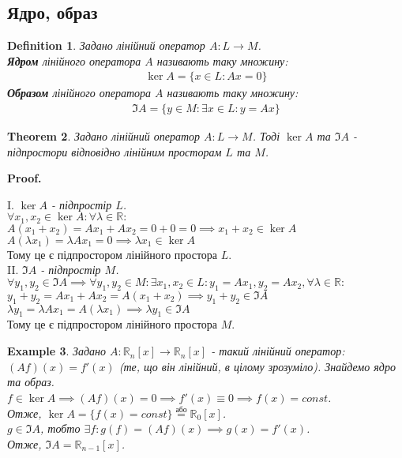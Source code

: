 \documentclass[a4paper, 10pt]{article}
\makeatletter
\theoremstyle{theoremdd}
\newtheorem{theorem}{Theorem}[subsection]
\newtheorem{definition}[theorem]{Definition}
\newtheorem{example}[theorem]{Example}
\renewenvironment{proof}[1][Proof.\\]{\par
\pushQED{\hfill \qed}%
\normalfont \topsep6\p@\@plus6\p@\relax
\trivlist
\item\relax
{\bfseries
#1\@addpunct{.}}\hspace\labelsep\ignorespaces
}{%
\popQED\endtrivlist\@endpefalse
}
\makeatother
\begin{document}
	\subsection{Ядро, образ}
	\begin{definition}
	Задано лінійний оператор $A \colon L \to M$.\\
	\textbf{Ядром} лінійного оператора $A$ називають таку множину:
	\begin{align*}
	\ker A = \{x \in L: Ax = 0\}
	\end{align*}
	\textbf{Образом} лінійного оператора $A$ називають таку множину:
	\begin{align*}
	\Im A = \{y \in M: \exists x \in L: y = Ax\}
	\end{align*}
	\end{definition}
	
	\begin{theorem}
	Задано лінійний оператор $A \colon L \to M$. Тоді $\ker A$ та $\Im A$ - підпростори відповідно лінійним просторам $L$ та $M$.
	\end{theorem}
	
	\begin{proof}
	I. \textit{$\ker A$ - підпростір $L$.}\\
	$\forall x_1, x_2 \in \ker A: \forall \lambda \in \mathbb{R}:$\\
	$A(x_1+x_2)=Ax_1+Ax_2 = 0 + 0 = 0 \implies x_1+x_2 \in \ker A$\\
	$A(\lambda x_1) = \lambda Ax_1 = 0 \implies \lambda x_1 \in \ker A$\\
	Тому це є підпростором лінійного простора $L$.
	\bigskip \\
	II. \textit{$\Im A$ - підпростір $M$.}\\
	$\forall y_1, y_2 \in \Im A \implies \forall y_1, y_2 \in M: \exists x_1, x_2 \in L: y_1 = Ax_1, y_2 = Ax_2, \forall \lambda \in \mathbb{R}:$\\
	$y_1 + y_2 = Ax_1 + Ax_2 = A(x_1+x_2) \implies y_1+y_2 \in \Im A$\\
	$\lambda y_1 = \lambda Ax_1 = A(\lambda x_1) \implies \lambda y_1 \in \Im A$\\
	Тому це є підпростором лінійного простора $M$.
	\end{proof}
	
	\begin{example}
	Задано $A \colon \mathbb{R}_n[x] \to \mathbb{R}_n[x]$ - такий лінійний оператор: \quad $(Af)(x) = f'(x)$ (те, що він лінійний, в цілому зрозуміло). Знайдемо ядро та образ.\\
	$f \in \ker A \implies (Af)(x) = 0 \implies f'(x) \equiv 0 \implies f(x) = const$. \\
	Отже, $\ker A = \{ f(x) = const\} \overset{\textrm{або}}{=} \mathbb{R}_0[x]$.
	\bigskip \\
	$g \in \Im A$, тобто $\exists f: g(f) = (Af)(x) \implies g(x) = f'(x)$. \\
	Отже, $\Im A = \mathbb{R}_{n-1}[x]$.
	\end{example}
\end{document}
